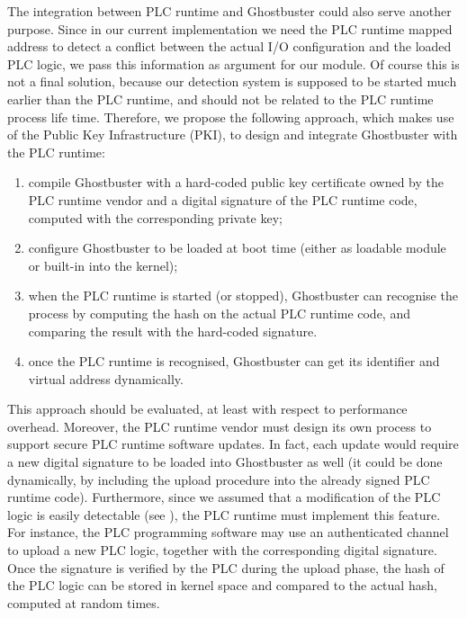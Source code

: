 The integration between PLC runtime and Ghostbuster could also serve another purpose. Since in our current implementation we need the PLC runtime mapped address
to detect a conflict between the actual I/O configuration and the loaded PLC logic, we pass this information as argument for our module.
Of course this is not a final solution, because our detection system is supposed to be started much earlier than the PLC runtime,
and should not be related to the PLC runtime process life time. Therefore, we propose the following approach, which makes use of the Public Key Infrastructure (PKI),
to design and integrate Ghostbuster with the PLC runtime:
\begin{enumerate}
	\item compile Ghostbuster with a hard-coded public key certificate owned by the PLC runtime vendor and a digital signature of the PLC runtime code,
		computed with the corresponding private key;
	\item configure Ghostbuster to be loaded at boot time (either as loadable module or built-in into the kernel);
	\item when the PLC runtime is started (or stopped), Ghostbuster can recognise the process by computing the hash on the actual PLC runtime code,
		and comparing the result with the hard-coded signature.
	\item once the PLC runtime is recognised, Ghostbuster can get its identifier and virtual address dynamically.
\end{enumerate}
This approach should be evaluated, at least with respect to performance overhead. Moreover, the PLC runtime vendor must design its own process to support secure
PLC runtime software updates. In fact, each update would require a new digital signature to be loaded into Ghostbuster as well (\eg it could be done dynamically,
by including the upload procedure into the already signed PLC runtime code).
Furthermore, since we assumed that a modification of the PLC logic is easily detectable (see ), the PLC runtime must implement this feature.
For instance, the PLC programming software may use an authenticated channel to upload a new PLC logic, together with the corresponding digital signature.
Once the signature is verified by the PLC during the upload phase, the hash of the PLC logic can be stored in kernel space and compared to the actual hash,
computed at random times.

